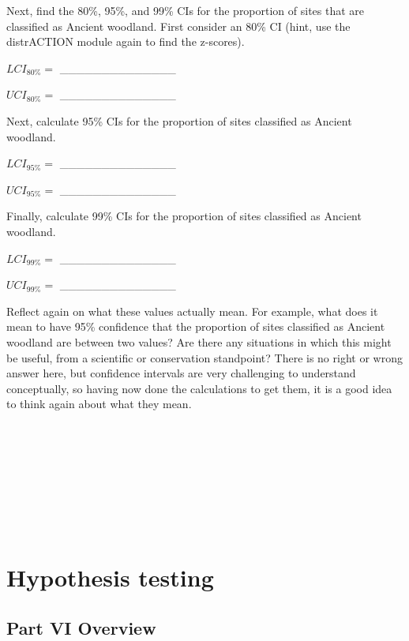 \documentclass[
]{scrbook}
\begin{document}
Next, find the 80\%, 95\%, and 99\% CIs for the proportion of sites that are classified as Ancient woodland.
First consider an 80\% CI (hint, use the distrACTION module again to find the z-scores).

\(LCI_{80\%} =\) \_\_\_\_\_\_\_\_\_\_\_\_\_\_

\(UCI_{80\%} =\) \_\_\_\_\_\_\_\_\_\_\_\_\_\_

Next, calculate 95\% CIs for the proportion of sites classified as Ancient woodland.

\(LCI_{95\%} =\) \_\_\_\_\_\_\_\_\_\_\_\_\_\_

\(UCI_{95\%} =\) \_\_\_\_\_\_\_\_\_\_\_\_\_\_

Finally, calculate 99\% CIs for the proportion of sites classified as Ancient woodland.

\(LCI_{99\%} =\) \_\_\_\_\_\_\_\_\_\_\_\_\_\_

\(UCI_{99\%} =\) \_\_\_\_\_\_\_\_\_\_\_\_\_\_

Reflect again on what these values actually mean.
For example, what does it mean to have 95\% confidence that the proportion of sites classified as Ancient woodland are between two values?
Are there any situations in which this might be useful, from a scientific or conservation standpoint?
There is no right or wrong answer here, but confidence intervals are very challenging to understand conceptually, so having now done the calculations to get them, it is a good idea to think again about what they mean.

\begin{verbatim}








\end{verbatim}

\hypertarget{part-hypothesis-testing}{%
\part{Hypothesis testing}\label{part-hypothesis-testing}}

\hypertarget{Week6}{%
\chapter*{Part VI Overview}\label{Week6}}
\end{document}
